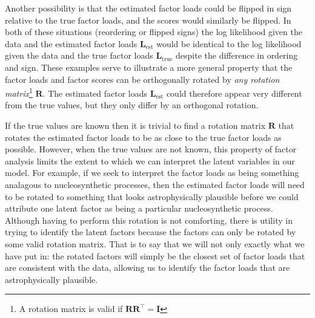\documentclass[twocolumn]{aastex62}
\newcommand{\vect}[1]{\boldsymbol{\mathbf{#1}}}
\renewcommand{\vec}[1]{\vect{#1}}
\newcommand{\transpose}{^\intercal}
\newcommand{\factorloads}{\textbf{L}}
\begin{document}
Another possibility is that the estimated factor loads could be flipped in sign 
relative to the true factor loads, and the scores would similarly be flipped. 
In both of these situations (reordering or flipped signs) the log likelihood 
given the data and the estimated factor loads $\factorloads_\textrm{est}$ would 
be identical to the log likelihood given the data and the true factor loads 
$\factorloads_\textrm{true}$
despite the difference in ordering and sign. These examples serve to illustrate a more 
general property that the factor loads and factor scores can be orthogonally 
rotated by \emph{any rotation matrix}\footnote{A rotation matrix is valid if 
$\vec{R}\vec{R}\transpose = \vec{I}$} $\vec{R}$. The estimated factor loads 
$\factorloads_\textrm{est}$ could therefore appear very different from the true 
values, but they only differ by an orthogonal rotation. 


If the true values are known then it is trivial to find a rotation matrix $\vec{R}$
that rotates the estimated factor loads to be as close to the true factor loads as
possible. However, when
the true values are not known, this property of factor analysis limits the
extent to which we can interpret the latent variables in our model. For example,
if we seek to interpret the factor loads as being something analagous to 
nucleosynthetic processes, then the estimated factor loads will need to be 
rotated to something that looks astrophysically plausible before we could 
attribute one latent factor as being a particular nucleosynthetic process. 
Although having to perform this rotation is not comforting, there is utility in
trying to identify the latent factors because the factors can only be rotated by
some valid rotation matrix. That is to say that we will not only exactly what
we have put in: the rotated factors will simply be the closest set of factor
loads that are consistent with the data, allowing us to identify the factor
loads that are astrophysically plausible.
\end{document}
